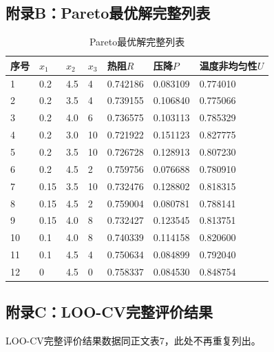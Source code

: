 \documentclass[12pt,a4paper]{ctexart}
\begin{document}
\subsection*{附录B：Pareto最优解完整列表}

\begin{table}[H]
\centering
\caption{Pareto最优解完整列表}
\footnotesize
\begin{tabular}{p{}p{}p{}p{}p{}p{}p{}}
\toprule
序号 & $x_1$ & $x_2$ & $x_3$ & 热阻$R$ & 压降$P$ & 温度非均匀性$U$ \\
\midrule
1 & 0.2 & 4.5 & 4 & 0.742186 & 0.083109 & 0.774010 \\
2 & 0.2 & 3.5 & 4 & 0.739155 & 0.106840 & 0.775066 \\
3 & 0.2 & 4.0 & 6 & 0.736575 & 0.103113 & 0.785329 \\
4 & 0.2 & 3.0 & 10 & 0.721922 & 0.151123 & 0.827775 \\
5 & 0.2 & 3.5 & 10 & 0.726728 & 0.128913 & 0.807230 \\
6 & 0.2 & 4.5 & 2 & 0.759756 & 0.076688 & 0.780910 \\
7 & 0.15 & 3.5 & 10 & 0.732476 & 0.128802 & 0.818315 \\
8 & 0.15 & 4.5 & 2 & 0.759004 & 0.080781 & 0.788141 \\
9 & 0.15 & 4.0 & 8 & 0.732427 & 0.123545 & 0.813751 \\
10 & 0.1 & 4.0 & 8 & 0.740339 & 0.114158 & 0.820600 \\
11 & 0.1 & 4.5 & 4 & 0.750634 & 0.084899 & 0.792040 \\
12 & 0 & 4.5 & 0 & 0.758337 & 0.084530 & 0.848754 \\
\bottomrule
\end{tabular}
\end{table}

\smallskip
{}

\subsection*{附录C：LOO-CV完整评价结果}

LOO-CV完整评价结果数据同正文表7，此处不再重复列出。
\end{document}
